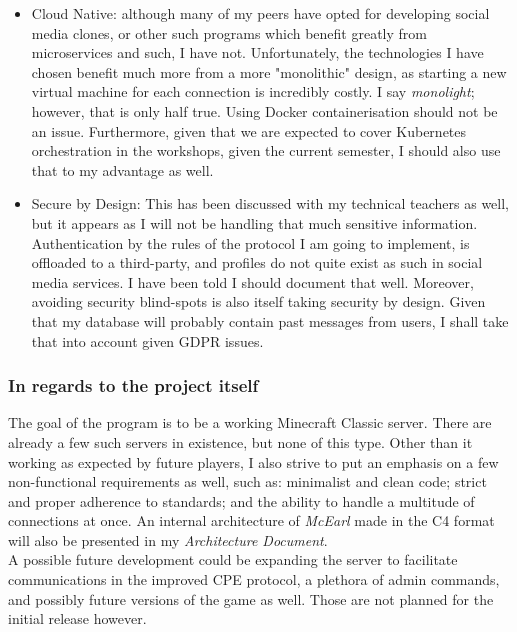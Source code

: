 \documentclass{article}
\begin{document}
        \begin{itemize}
            \item Cloud Native: although many of my peers have opted for developing social media clones, or other such programs which benefit greatly from microservices and such, I have not. Unfortunately, the technologies I have chosen benefit much more from a more "monolithic" design, as starting a new virtual machine for each connection is incredibly costly. I say \emph{monolight}; however, that is only half true. Using Docker containerisation should not be an issue. Furthermore, given that we are expected to cover Kubernetes orchestration in the workshops, given the current semester, I should also use that to my advantage as well.
            \item Secure by Design: This has been discussed with my technical teachers as well, but it appears as I will not be handling that much sensitive information. Authentication by the rules of the protocol I am going to implement, is offloaded to a third-party, and profiles do not quite exist as such in social media services. I have been told I should document that well. Moreover, avoiding security blind-spots is also itself taking security by design. Given that my database will probably contain past messages from users, I shall take that into account given GDPR issues.
        \end{itemize}

    \subsubsection{In regards to the project itself}
    The goal of the program is to be a working Minecraft Classic server. There are already a few such servers in existence, but none of this type. Other than it working as expected by future players, I also strive to put an emphasis on a few non-functional requirements as well, such as: minimalist and clean code; strict and proper adherence to standards; and the ability to handle a multitude of connections at once. An internal architecture of \emph{McEarl} made in the C4 format will also be presented in my \emph{Architecture Document}. \\

    A possible future development could be expanding the server to facilitate communications in the improved CPE protocol, a plethora of admin commands, and possibly future versions of the game as well. Those are not planned for the initial release however.
\end{document}
